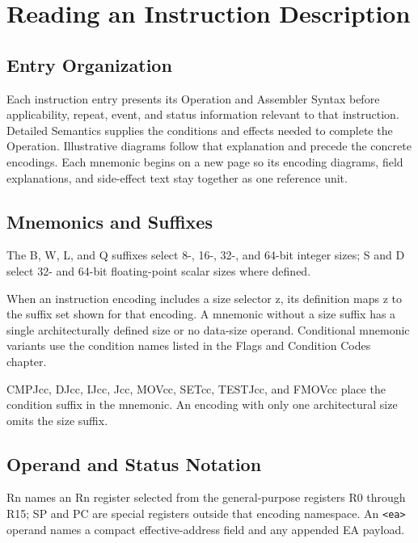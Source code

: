 \clearpage
\begingroup
\setlength{\parskip}{1pt}
\titlespacing*{\section}{0pt}{0.8em}{0.45em}
\titlespacing*{\subsection}{0pt}{0.45em}{0.25em}
\section*{Reading an Instruction Description}\label{page:reading-an-instruction-description}
{}
\subsection*{Entry Organization}
Each instruction entry presents its Operation and Assembler Syntax before applicability, repeat, event, and
status information relevant to that instruction. Detailed Semantics supplies the conditions and effects needed to
complete the Operation. Illustrative diagrams follow that explanation and precede the concrete encodings. Each mnemonic begins
on a new page so its encoding diagrams, field explanations, and side-effect text stay together as one reference
unit.

\subsection*{Mnemonics and Suffixes}
The B, W, L, and Q suffixes select 8-, 16-, 32-, and 64-bit integer sizes; S and D select 32- and 64-bit
floating-point scalar sizes where defined.

When an instruction encoding includes a size selector z, its definition maps z to the suffix set shown for that encoding. A
mnemonic without a size suffix has a single architecturally defined size or no data-size operand.
Conditional mnemonic variants use the condition names listed in the Flags and Condition Codes chapter.

CMPJcc, DJcc, IJcc, Jcc, MOVcc, SETcc, TESTJcc, and FMOVcc place the condition suffix in the mnemonic. An encoding with
only one architectural size omits the size suffix.

\subsection*{Operand and Status Notation}
Rn names an Rn register selected from the general-purpose registers R0 through R15; SP and PC are special registers
outside that encoding namespace. An
\texttt{<ea>} operand names a compact effective-address field and any appended EA payload.

